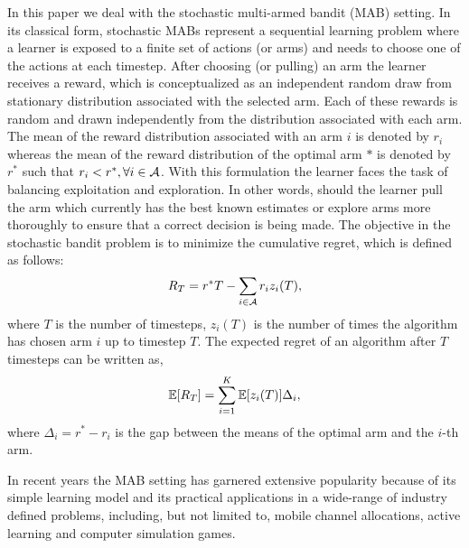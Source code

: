 In this paper we deal with the stochastic multi-armed bandit (MAB) setting. In its classical form, stochastic MABs represent a sequential learning problem where a learner is exposed to a finite set of actions (or arms) and needs to choose one of the actions at each timestep. After choosing (or pulling) an arm the learner  receives a reward, which is conceptualized as an independent random draw from stationary distribution associated with the selected arm. Each of these rewards is random and drawn independently from the distribution associated with each arm. The mean of the reward distribution associated with an arm $i$ is denoted by $r_i$ whereas the mean of the reward distribution of the optimal arm $*$ is denoted by $r^*$ such that $r_i < r^*, \forall i\in \mathcal{A}$. With this formulation the learner faces the task of balancing exploitation and exploration. In other words, should the learner pull the arm which currently has the best known estimates or explore arms more thoroughly to ensure that a correct decision is being made. The objective in the stochastic bandit problem is to minimize the cumulative regret, which is defined as follows:
\begin{align*}
R_{T}=r^{*}T - \sum_{i\in \mathcal{A}} r_{i}z_{i}(T),
\end{align*}
where $T$ is the number of timesteps, $z_{i}(T)$ is the number of times the algorithm has chosen arm $i$ up to timestep $T$.
The expected regret of an algorithm after $T$ timesteps can be written as,
\begin{align*}
\mathbb{E}[R_{T}]= \sum_{i=1}^K \mathbb{E}[z_i (T)] \Delta_i,
\end{align*}
where $\Delta_{i}=r^{*}-r_{i}$ is the gap between the means of the optimal arm and the $i$-th arm.


	In recent years the MAB setting has garnered extensive popularity because of its simple learning  model and its practical applications in a wide-range of industry defined problems, including, but not limited to, mobile channel allocations, active learning and computer simulation games. 